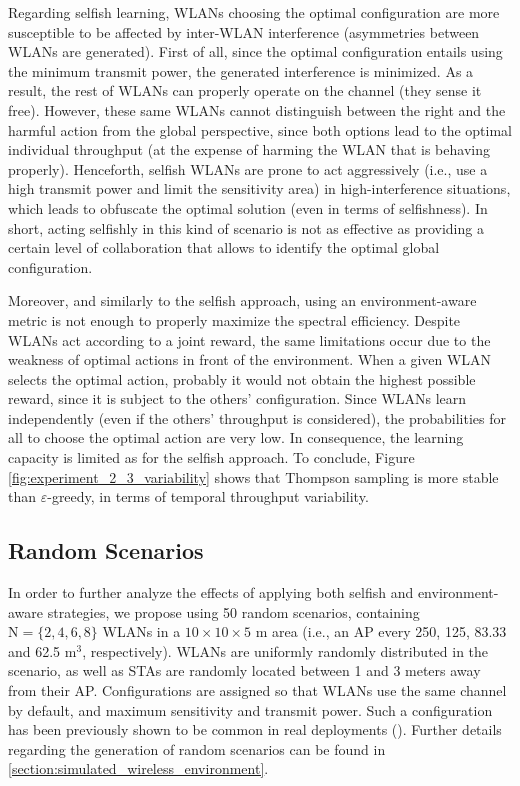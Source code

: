 \documentclass[preprint,12pt]{elsarticle}
\begin{document}
Regarding selfish learning, WLANs choosing the optimal configuration are more susceptible to be affected by inter-WLAN interference (asymmetries between WLANs are generated). First of all, since the optimal configuration entails using the minimum transmit power, the generated interference is minimized. As a result, the rest of WLANs can properly operate on the channel (they sense it free). However, these same WLANs cannot distinguish between the right and the harmful action from the global perspective, since both options lead to the optimal individual throughput (at the expense of harming the WLAN that is behaving properly). Henceforth, selfish WLANs are prone to act aggressively (i.e., use a high transmit power and limit the sensitivity area) in high-interference situations, which leads to obfuscate the optimal solution (even in terms of selfishness). In short, acting selfishly in this kind of scenario is not as effective as providing a certain level of collaboration that allows to identify the optimal global configuration.

Moreover, and similarly to the selfish approach, using an environment-aware metric is not enough to properly maximize the spectral efficiency. Despite WLANs act according to a joint reward, the same limitations occur due to the weakness of optimal actions in front of the environment. When a given WLAN selects the optimal action, probably it would not obtain the highest possible reward, since it is subject to the others' configuration. Since WLANs learn independently (even if the others' throughput is considered), the probabilities for all to choose the optimal action are very low. In consequence, the learning capacity is limited as for the selfish approach. To conclude, Figure \ref{fig:experiment_2_3_variability} shows that Thompson sampling is more stable than $\varepsilon$-greedy, in terms of temporal throughput variability.

\subsection{Random Scenarios}
\label{section:scalability}	
In order to further analyze the effects of applying both selfish and environment-aware strategies, we propose using 50 random scenarios, containing $\text{N} = \{2, 4, 6, 8\}$ WLANs in a $10\times10\times5$ m area (i.e., an AP every 250, 125, 83.33 and 62.5 $\text{m}^3$, respectively). WLANs are uniformly randomly distributed in the scenario, as well as STAs are randomly located between 1 and 3 meters away from their AP. Configurations are assigned so that WLANs use the same channel by default, and maximum sensitivity and transmit power. Such a configuration has been previously shown to be common in real deployments (\citealp{akella2007self}). Further details regarding the generation of random scenarios can be found in \ref{section:simulated_wireless_environment}.
\end{document}
